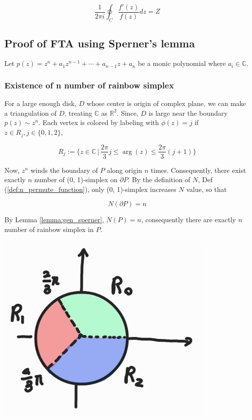 \documentclass[a4paper,12pt]{article}
\begin{document}
\begin{equation}
    \frac{1}{2 \pi i} \oint_{C} \frac{f'(z)}{f(z)} dz=  Z 
\end{equation}


\subsection{Proof of FTA using Sperner's lemma}

Let $p(z) = z^n + a_1 z^{n-1} + \cdots + a_{n-1} z + a_n$ be a monic polynomial
where $a_i \in \mathbb{C}$.

\subsubsection{Existence of n number of rainbow simplex}
For a large enough disk, $D$ whose center is origin of complex plane,
we can make a triangulation of $D$, treating $\mathbb{C}$ as $\mathbb{R}^2$.
Since, $D$ is large near the boundary $p(z) \sim z^n$.
Each vertex is colored by labeling with $\phi(z) = j$ if $z \in R_j, j \in \{0, 1, 2\}$,

\begin{equation}
    \label{eq:phase_color}
    R_j := \{z \in \mathbb{C}\, | \,\frac{2 \pi}{3} j \leq \arg(z) \leq \frac{2 \pi}{3} (j +1)\}
\end{equation}
{
\noindent
\begin{minipage}{0.45\textwidth}
    Now, $z^n$ winds the boundary of $P$ along origin $n$ times.
    Consequently, there exist exactly $n$ number of (0, 1)-simplex on $\partial P$.
    By the definition of $N$, Def (\ref{def:n_permute_function}), only (0, 1)-simplex 
    increases $N$ value, so that

    \begin{equation}
        N(\partial P) = n
    \end{equation}

    By Lemma \ref{lemma:gen_sperner}, $N(P) = n$, consequently there are exactly $n$ number of rainbow simplex 
    in $P$.
\end{minipage}
\hfill
\begin{minipage}{0.45\textwidth}
    \centering
        \includegraphics[width=0.8\textwidth]{phase.jpeg}
\end{minipage}
}
\end{document}
